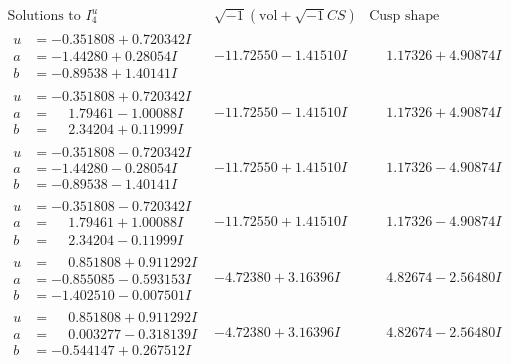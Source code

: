 \documentclass[1p]{elsarticle_modified}
\theoremstyle{definition}
\newcommand{\I}{\sqrt{-1}}
\begin{document}
$$\begin{array}{c|c|c}  
\text{Solutions to }I^u_{4}& \I (\text{vol} + \sqrt{-1}CS) & \text{Cusp shape}\\
 \hline 
\begin{aligned}
u &= -0.351808 + 0.720342 I \\
a &= -1.44280 + 0.28054 I \\
b &= -0.89538 + 1.40141 I\end{aligned}
 & -11.72550 - 1.41510 I & \phantom{-}1.17326 + 4.90874 I \\ \hline\begin{aligned}
u &= -0.351808 + 0.720342 I \\
a &= \phantom{-}1.79461 - 1.00088 I \\
b &= \phantom{-}2.34204 + 0.11999 I\end{aligned}
 & -11.72550 - 1.41510 I & \phantom{-}1.17326 + 4.90874 I \\ \hline\begin{aligned}
u &= -0.351808 - 0.720342 I \\
a &= -1.44280 - 0.28054 I \\
b &= -0.89538 - 1.40141 I\end{aligned}
 & -11.72550 + 1.41510 I & \phantom{-}1.17326 - 4.90874 I \\ \hline\begin{aligned}
u &= -0.351808 - 0.720342 I \\
a &= \phantom{-}1.79461 + 1.00088 I \\
b &= \phantom{-}2.34204 - 0.11999 I\end{aligned}
 & -11.72550 + 1.41510 I & \phantom{-}1.17326 - 4.90874 I \\ \hline\begin{aligned}
u &= \phantom{-}0.851808 + 0.911292 I \\
a &= -0.855085 - 0.593153 I \\
b &= -1.402510 - 0.007501 I\end{aligned}
 & -4.72380 + 3.16396 I & \phantom{-}4.82674 - 2.56480 I \\ \hline\begin{aligned}
u &= \phantom{-}0.851808 + 0.911292 I \\
a &= \phantom{-}0.003277 - 0.318139 I \\
b &= -0.544147 + 0.267512 I\end{aligned}
 & -4.72380 + 3.16396 I & \phantom{-}4.82674 - 2.56480 I \\ \hline\begin{aligned}

\end{aligned}
\end{array}$$
\end{document}
